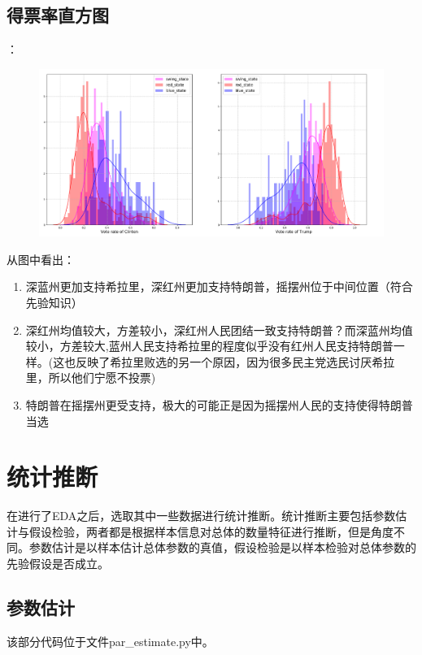 \documentclass[
12pt, %
UTF8
]{fphw}
\begin{document}
	\subsection{得票率直方图}：\\
	\begin{figure}[H]
		\centering
		\includegraphics[scale=0.55]{vote_rate.png}
	\end{figure}
	从图中看出：
	\begin{enumerate}
		\item 深蓝州更加支持希拉里，深红州更加支持特朗普，摇摆州位于中间位置（符合先验知识）
		\item 深红州均值较大，方差较小，深红州人民团结一致支持特朗普？而深蓝州均值较小，方差较大,蓝州人民支持希拉里的程度似乎没有红州人民支持特朗普一样。(这也反映了希拉里败选的另一个原因，因为很多民主党选民讨厌希拉里，所以他们宁愿不投票)
		\item 特朗普在摇摆州更受支持，极大的可能正是因为摇摆州人民的支持使得特朗普当选
	\end{enumerate}


\section{统计推断}
在进行了EDA之后，选取其中一些数据进行统计推断。统计推断主要包括参数估计与假设检验，两者都是根据样本信息对总体的数量特征进行推断，但是角度不同。参数估计是以样本估计总体参数的真值，假设检验是以样本检验对总体参数的先验假设是否成立。
	\subsection{参数估计}
	该部分代码位于文件par\_estimate.py中。
\end{document}
